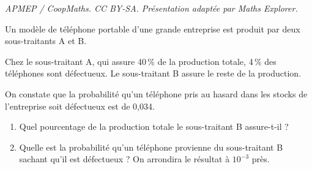 \documentclass[10pt]{article}
\begin{document}
\noindent\textit{APMEP / CoopMaths. CC BY-SA. Présentation adaptée par Maths Explorer.}\par\medskip
\medskip

Un modèle de téléphone portable d'une grande entreprise est produit par deux sous-traitants A et B.

\medskip

Chez le sous-traitant A, qui assure 40\,\% de la production totale, 4\,\% des téléphones sont défectueux.
Le sous-traitant B assure le reste de la production.

On constate que la probabilité qu'un téléphone pris au hasard dans les stocks de l'entreprise soit défectueux est de 0,034.

\medskip

\begin{enumerate}
\item Quel pourcentage de la production totale le sous-traitant B assure-t-il ?
\item Quelle est la probabilité qu'un téléphone provienne du sous-traitant B
sachant qu'il est défectueux ? On arrondira le résultat à $10^{-3}$ près.
\end{enumerate}

\bigskip
\end{document}
